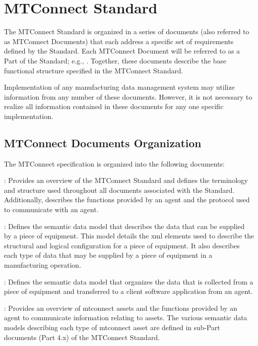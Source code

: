 \section{MTConnect Standard} 
\label{mtconnect-standard}

The MTConnect Standard is organized in a series of documents (also referred to as MTConnect Documents) that each address a specific set of requirements defined by the Standard.   Each MTConnect Document will be referred to as a Part of the Standard; e.g., .  Together, these documents describe the \gls{base functional structure} specified in the MTConnect Standard.  

Implementation of any manufacturing data management system may utilize information from any number of these documents.  However, it is not necessary to realize all information contained in these documents for any one specific implementation.

\subsection{MTConnect Documents Organization}

The MTConnect specification is organized into the following documents:

:  Provides an overview of the MTConnect Standard and defines the terminology and structure used throughout all documents associated with the Standard.  Additionally, \cite{MTCPart1} describes the functions provided by an \gls{agent} and the protocol used to communicate with an \gls{agent}.

:  Defines the \gls{semantic data model} that describes the data that can be supplied by a piece of equipment.  This model details the \gls{xml} elements used to describe the structural and logical configuration for a piece of equipment.  It also describes each type of data that may be supplied by a piece of equipment in a manufacturing operation.

:  Defines the \gls{semantic data model} that organizes the data that is collected from a piece of equipment and transferred to a client software application from an \gls{agent}.

:  Provides an overview of \glspl{mtconnect asset} and the functions provided by an \gls{agent} to communicate information relating to \glspl{asset}.   The various \glspl{semantic data model} describing each type of \gls{mtconnect asset} are defined in sub-Part documents (Part 4.x) of the MTConnect Standard.

